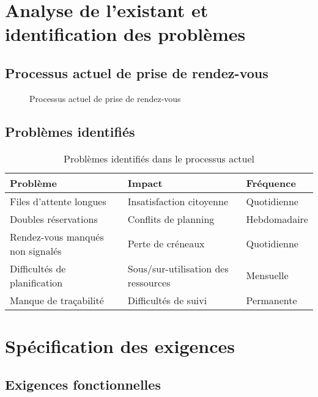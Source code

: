 \section{Analyse de l'existant et identification des problèmes}

\subsection{Processus actuel de prise de rendez-vous}

\begin{figure}[h]
    \centering
    \caption{Processus actuel de prise de rendez-vous}
    \label{fig:current_process}
\end{figure}

\subsection{Problèmes identifiés}

\begin{table}[h]
\centering
\begin{tabular}{|p{4cm}|p{4cm}|p{4cm}|}
\hline
\textbf{Problème} & \textbf{Impact} & \textbf{Fréquence} \\
\hline
Files d'attente longues & Insatisfaction citoyenne & Quotidienne \\
\hline
Doubles réservations & Conflits de planning & Hebdomadaire \\
\hline
Rendez-vous manqués non signalés & Perte de créneaux & Quotidienne \\
\hline
Difficultés de planification & Sous/sur-utilisation des ressources & Mensuelle \\
\hline
Manque de traçabilité & Difficultés de suivi & Permanente \\
\hline
\end{tabular}
\caption{Problèmes identifiés dans le processus actuel}
\label{tab:problems}
\end{table}

\section{Spécification des exigences}

\subsection{Exigences fonctionnelles}

